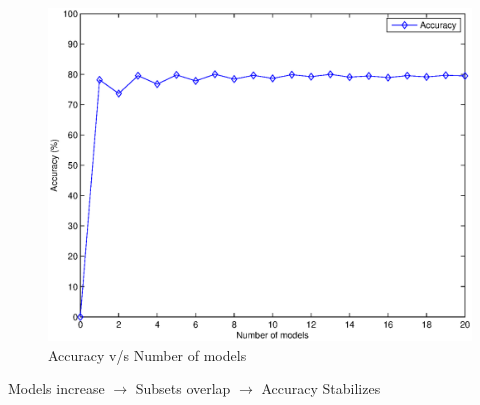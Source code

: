 \documentclass{beamer}
\begin{document}
\begin{frame}
\begin{columns}
\begin{column}{0.5\textwidth}
\begin{figure}
                    \centering
                    \includegraphics[width=\textwidth]{figures/bagging_n_models.eps}
                    \caption{\small Accuracy v/s Number of models}
                \end{figure}
                \begin{center}
                    \small Models increase $\rightarrow$ Subsets overlap $\rightarrow$ Accuracy Stabilizes
                \end{center}
            \end{column}
        \end{columns}
    \end{frame}
    
\end{document}
